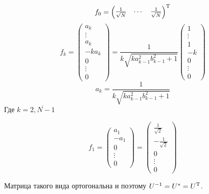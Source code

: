 \begin{lemma}
\begin{minipage}{0.9\textwidth}
            \[f_0 = \begin{pmatrix} \frac{1}{\sqrt N} & \cdots & \frac{1}{\sqrt N} \end{pmatrix}^{\mathrm{T}}\]
                \providecommand{\fknorm}{\sqrt{k a_{k-1}^2 b_{k-1}^2 + 1}}
            \[
                f_k =
            \begin{pmatrix}a_k \\ \vdots \\ a_k \\ -ka_k \\ 0 \\ \vdots \\ 0 \end{pmatrix} =
                \frac{1}{k\fknorm}
            \begin{pmatrix}1 \\ \vdots \\ 1 \\ -k \\ 0 \\ \vdots \\ 0 \end{pmatrix}
                \]
            \[
                a_k = \frac{1}{k\fknorm}
            \]
        Где \( k=\overline{2,N-1} \)

            \[
                f_1
             = \begin{pmatrix}a_1 \\ -a_1 \\ 0 \\ \vdots \\ 0 \end{pmatrix}
                 = \begin{pmatrix}\frac1{\sqrt2} \\ - \frac{1}{\sqrt2} \\ 0 \\ \vdots \\ 0 \end{pmatrix}
                     \]

                 Матрица такого вида ортогональна и поэтому
            \( U^{-1} = U^{\mathrm{*}} = U^{\mathrm{T}} \).
        \end{minipage}
\end{lemma}
